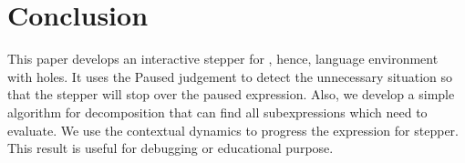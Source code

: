\section{Conclusion}

This paper develops an interactive stepper for \Hazel, hence, language environment with holes. It uses the Paused judgement to detect the unnecessary situation so that the stepper will stop over the paused expression. Also, we develop a simple algorithm for decomposition that can find all subexpressions which need to evaluate. We use the contextual dynamics to progress the expression for stepper. This result is useful for debugging or educational purpose.
